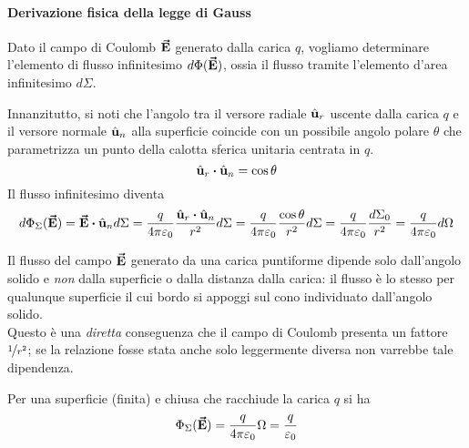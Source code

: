 \paragraph{Derivazione fisica della legge di Gauss}
Dato il campo di Coulomb $\vb*{\va{E}}$ generato dalla carica $q$, vogliamo determinare l'elemento di flusso infinitesimo $d\Phi(\vb*{\va{E}})$, ossia il flusso tramite l'elemento d'area infinitesimo $d\Sigma$.

Innanzitutto, si noti che l'angolo tra il versore radiale $\hat{\mathbf{u}}_r$ uscente dalla carica $q$ e il versore normale $\hat{\mathbf{u}}_n$ alla superficie coincide con un possibile angolo polare $\theta$ che parametrizza un punto della calotta sferica unitaria centrata in $q$.
\begin{equation*}
\vbh{u}_r\vdot\vbh{u}_n=\cos\theta
\end{equation*}
Il flusso infinitesimo diventa
\begin{equation*}
	d\Phi_{\Sigma}(\vba{E})=\vba{E}\vdot\vbh{u}_nd\Sigma=\frac{q}{4\pi\epsilon_0}\frac{\vbh{u}_r\vdot\vbh{u}_n}{r^2}d\Sigma=\frac{q}{4\pi\epsilon_0}\frac{\cos\theta}{r^2}d\Sigma=\frac{q}{4\pi\epsilon_0}\frac{d\Sigma_0}{r^2}=\frac{q}{4\pi\epsilon_0}d\Omega
\end{equation*}
\begin{observe}
	Il flusso del campo $\vb*{\va{E}}$ generato da una carica puntiforme dipende solo dall'angolo solido e \textit{non} dalla superficie o dalla distanza dalla carica: il flusso è lo stesso per qualunque superficie il cui bordo si appoggi sul cono individuato dall'angolo solido.\\
	Questo è una \textit{diretta} conseguenza che il campo di Coulomb presenta un fattore $\nicefrac{1}{r^2}$; se la relazione fosse stata anche solo leggermente diversa non varrebbe tale dipendenza.
\end{observe}
Per una superficie (finita) e chiusa che racchiude la carica $q$ si ha
 \begin{equation*}
 	\Phi_\Sigma(\vb*{\va{E}})=\frac{q}{4\pi\varepsilon_0}\Omega=\frac{q}{\varepsilon_0}
 \end{equation*}

